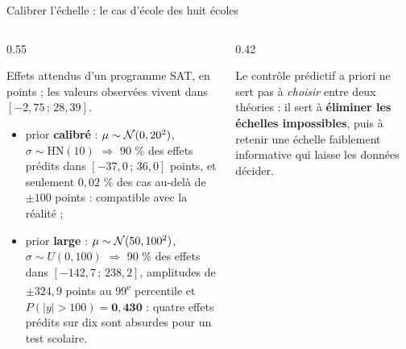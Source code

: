 \begin{frame}{Calibrer l'échelle : le cas d'école des huit écoles}

\vspace{-1mm}
\begin{columns}[t]
\begin{column}{0.55\textwidth}
\begin{ebox}
Effets attendus d'un programme SAT, en points ; les valeurs observées vivent
dans $[-2{,}75 \,;\, 28{,}39]$.
\begin{itemize}
  \item prior \textbf{calibré} : $\mu \sim \mathcal{N}(0, 20^2)$, $\sigma \sim \mathrm{HN}(10)$
        $\Rightarrow$ 90 \% des effets prédits dans $[-37{,}0 \,;\, 36{,}0]$ points, et
        seulement $0{,}02$ \% des cas au-delà de $\pm 100$ points : compatible avec la réalité ;
  \item prior \textbf{large} : $\mu \sim \mathcal{N}(50, 100^2)$, $\sigma \sim U(0,100)$
        $\Rightarrow$ 90 \% des effets dans $[-142{,}7 \,;\, 238{,}2]$, amplitudes
        de $\pm 324{,}9$ points au 99\textsuperscript{e} percentile et
        $P(|y| > 100) = \mathbf{0{,}430}$ : quatre effets prédits sur dix sont
        absurdes pour un test scolaire.
\end{itemize}
\end{ebox}
\end{column}
\begin{column}{0.42\textwidth}
\begin{kbox}[Le réflexe]
Le contrôle prédictif a priori ne sert pas à \emph{choisir} entre deux théories :
il sert à \textbf{éliminer les échelles impossibles}, puis à retenir une échelle
faiblement informative qui laisse les données décider.
\end{kbox}
\end{column}
\end{columns}
\end{frame}

